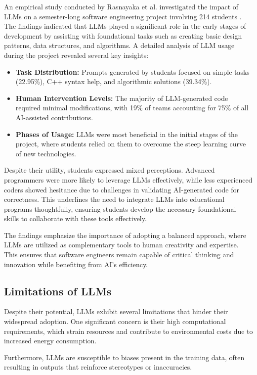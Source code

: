 An empirical study conducted by Rasnayaka et al. investigated the impact of LLMs on a semester-long software engineering project involving 214 students \cite{rasnayaka2024}. The findings indicated that LLMs played a significant role in the early stages of development by assisting with foundational tasks such as creating basic design patterns, data structures, and algorithms. A detailed analysis of LLM usage during the project revealed several key insights:
\begin{itemize}
    \item \textbf{Task Distribution:} Prompts generated by students focused on simple tasks (22.95\%), C++ syntax help, and algorithmic solutions (39.34\%).
    \item \textbf{Human Intervention Levels:} The majority of LLM-generated code required minimal modifications, with 19\% of teams accounting for 75\% of all AI-assisted contributions.
    \item \textbf{Phases of Usage:} LLMs were most beneficial in the initial stages of the project, where students relied on them to overcome the steep learning curve of new technologies.
\end{itemize}

Despite their utility, students expressed mixed perceptions. Advanced programmers were more likely to leverage LLMs effectively, while less experienced coders showed hesitance due to challenges in validating AI-generated code for correctness. This underlines the need to integrate LLMs into educational programs thoughtfully, ensuring students develop the necessary foundational skills to collaborate with these tools effectively.

The findings emphasize the importance of adopting a balanced approach, where LLMs are utilized as complementary tools to human creativity and expertise. This ensures that software engineers remain capable of critical thinking and innovation while benefiting from AI's efficiency.
\subsection{Limitations of LLMs}

Despite their potential, LLMs exhibit several limitations that hinder their widespread adoption. One significant concern is their high computational requirements, which strain resources and contribute to environmental costs due to increased energy consumption. 

Furthermore, LLMs are susceptible to biases present in the training data, often resulting in outputs that reinforce stereotypes or inaccuracies. 

